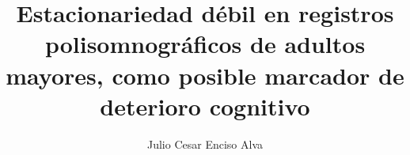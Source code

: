 %
\title{Estacionariedad d\'ebil en registros polisomnogr\'aficos de adultos mayores,
como posible marcador de deterioro cognitivo}
%
\author{Julio Cesar Enciso Alva}
%
%
